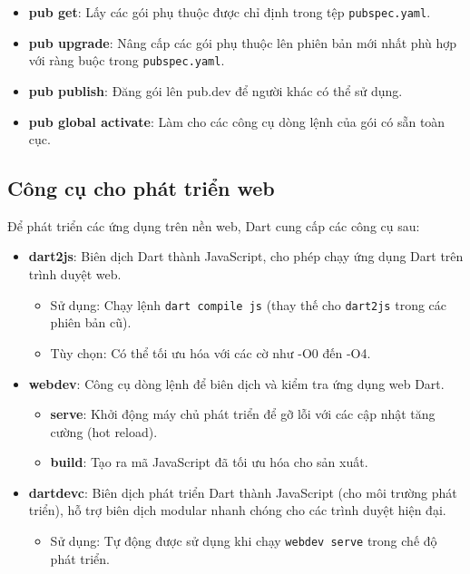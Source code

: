 \documentclass[../DoAn.tex]{subfiles}
\numberwithin{figure}{chapter}
\begin{document}
\begin{itemize}
    \begin{itemize}
        \item \textbf{pub get}: Lấy các gói phụ thuộc được chỉ định trong tệp \texttt{pubspec.yaml}.
        \item \textbf{pub upgrade}: Nâng cấp các gói phụ thuộc lên phiên bản mới nhất phù hợp với ràng buộc trong \texttt{pubspec.yaml}.
        \item \textbf{pub publish}: Đăng gói lên pub.dev để người khác có thể sử dụng.
        \item \textbf{pub global activate}: Làm cho các công cụ dòng lệnh của gói có sẵn toàn cục.
    \end{itemize}
\end{itemize}

\subsection{Công cụ cho phát triển web}

Để phát triển các ứng dụng trên nền web, Dart cung cấp các công cụ sau:

\begin{itemize}
    \item \textbf{dart2js}: Biên dịch Dart thành JavaScript, cho phép chạy ứng dụng Dart trên trình duyệt web.
    \begin{itemize}
        \item Sử dụng: Chạy lệnh \texttt{dart compile js} (thay thế cho \texttt{dart2js} trong các phiên bản cũ).
        \item Tùy chọn: Có thể tối ưu hóa với các cờ như -O0 đến -O4.
    \end{itemize}
    \item \textbf{webdev}: Công cụ dòng lệnh để biên dịch và kiểm tra ứng dụng web Dart.
    \begin{itemize}
        \item \textbf{serve}: Khởi động máy chủ phát triển để gỡ lỗi với các cập nhật tăng cường (hot reload).
        \item \textbf{build}: Tạo ra mã JavaScript đã tối ưu hóa cho sản xuất.
    \end{itemize}
    \item \textbf{dartdevc}: Biên dịch phát triển Dart thành JavaScript (cho môi trường phát triển), hỗ trợ biên dịch modular nhanh chóng cho các trình duyệt hiện đại.
    \begin{itemize}
        \item Sử dụng: Tự động được sử dụng khi chạy \texttt{webdev serve} trong chế độ phát triển.
    \end{itemize}
\end{itemize}
\end{document}
